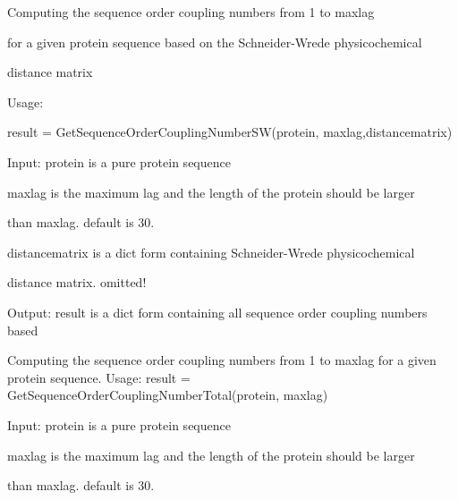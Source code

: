 \documentclass[letterpaper,10pt,english]{sphinxmanual}
\begin{document}
\begin{fulllineitems}
\label{reference/QuasiSequenceOrder:QuasiSequenceOrder.GetSequenceOrderCouplingNumberSW}
Computing the sequence order coupling numbers from 1 to maxlag

for a given protein sequence based on the Schneider-Wrede physicochemical

distance matrix

Usage:

result = GetSequenceOrderCouplingNumberSW(protein, maxlag,distancematrix)

Input: protein is a pure protein sequence

maxlag is the maximum lag and the length of the protein should be larger

than maxlag. default is 30.

distancematrix is a dict form containing Schneider-Wrede physicochemical

distance matrix. omitted!

Output: result is a dict form containing all sequence order coupling numbers based

\end{fulllineitems}


\begin{fulllineitems}
\label{reference/QuasiSequenceOrder:QuasiSequenceOrder.GetSequenceOrderCouplingNumberTotal}
Computing the sequence order coupling numbers from 1 to maxlag
for a given protein sequence.
Usage:
result = GetSequenceOrderCouplingNumberTotal(protein, maxlag)

Input: protein is a pure protein sequence

maxlag is the maximum lag and the length of the protein should be larger

than maxlag. default is 30.

\end{fulllineitems}

\end{document}
